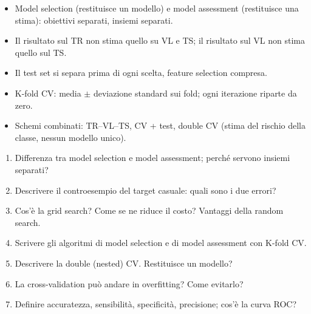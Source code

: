 \begin{puntichiave}
\begin{itemize}
  \item Model selection (restituisce un modello) e model assessment (restituisce una stima): obiettivi separati,
        insiemi separati.
  \item Il risultato sul TR non stima quello su VL e TS; il risultato sul VL non stima quello sul TS.
  \item Il test set si separa prima di ogni scelta, feature selection compresa.
  \item K-fold CV: media $\pm$ deviazione standard sui fold; ogni iterazione riparte da zero.
  \item Schemi combinati: TR--VL--TS, CV + test, double CV (stima del rischio della classe, nessun modello unico).
\end{itemize}
\end{puntichiave}

\begin{domande}
\begin{enumerate}
  \item Differenza tra model selection e model assessment; perché servono insiemi separati?
  \item Descrivere il controesempio del target casuale: quali sono i due errori?
  \item Cos'è la grid search? Come se ne riduce il costo? Vantaggi della random search.
  \item Scrivere gli algoritmi di model selection e di model assessment con K-fold CV.
  \item Descrivere la double (nested) CV. Restituisce un modello?
  \item La cross-validation può andare in overfitting? Come evitarlo?
  \item Definire accuratezza, sensibilità, specificità, precisione; cos'è la curva ROC?
\end{enumerate}
\end{domande}
